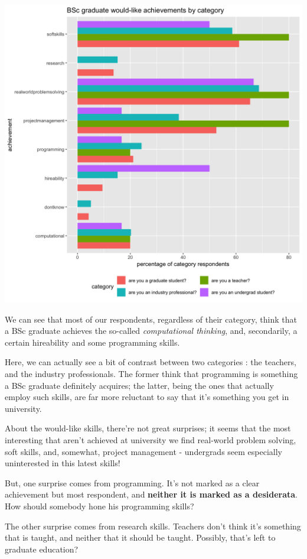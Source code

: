 \documentclass{sigchi}
\begin{document}
\includegraphics[scale=0.2]{../data-analysis/plots_output/BSc_graduate_would-like_achievements_by_category.png}

We can see that most of our respondents, regardless of their category, think that a BSc graduate achieves the so-called \textit{computational thinking}, and, secondarily, a certain hireability and some programming skills. 

Here, we can actually see a bit of contrast between two categories : the teachers, and the industry professionals. The former think that programming is something a BSc graduate definitely acquires; the latter, being the ones that actually employ such skills, are far more reluctant to say that it's something you get in university.

About the would-like skills, there're not great surprises; it seems that the most interesting that aren't achieved at university we find real-world problem solving, soft skills, and, somewhat, project management - undergrads seem especially uninterested in this latest skills!

But, one surprise comes from programming. It's not marked as a clear achievement but most respondent, and \textbf{neither it is marked as a desiderata}. How should somebody hone his programming skills?

The other surprise comes from research skills. Teachers don't think it's something that is taught, and neither that it should be taught. Possibly, that's left to graduate education?\newline
\end{document}
